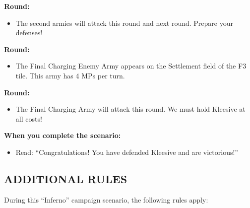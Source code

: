 \begin{multicols*}{2}
\columnbreak

\textbf{ Round:}
\begin{itemize}
  \item The second armies will attack this round and next round. Prepare your defenses!
\end{itemize}


\textbf{ Round:}
\begin{itemize}
  \item The Final Charging Enemy Army appears on the Settlement field of the F3 tile. This army has 4 MPs per turn.
\end{itemize}

\textbf{ Round:}
\begin{itemize}
  \item The Final Charging Army will attack this round. We must hold Kleesive at all costs!
\end{itemize}

\textbf{When you complete the scenario:}
\begin{itemize}
  \item Read: ``Congratulations! You have defended Kleesive and are victorious!''
\end{itemize}

\subsection*{\MakeUppercase{Additional rules}}

During this ``Inferno'' campaign scenario, the following rules apply:


\end{multicols*}

